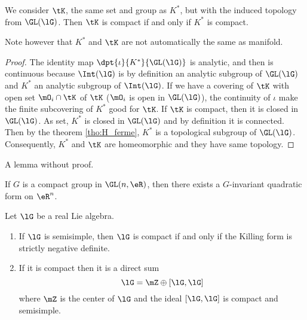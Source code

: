 \begin{proposition}
We consider $\tK$, the same set and group as $K^*$, but with the induced topology from $\GL(\lG)$. Then $\tK$ is compact if and only if $K^*$ is compact.
\end{proposition}

Note however that $K^*$ and $\tK$ are not automatically the same as manifold.

\begin{proof}
The identity map $\dpt{\iota}{K^*}{\GL(\lG)}$ is analytic, and then is continuous because $\Int(\lG)$ is by definition an analytic subgroup of $\GL(\lG)$ and $K^*$ an analytic subgroup of $\Int(\lG)$. If we have a covering of $\tK$ with open set $\mO_i\cap\tK$ of $\tK$ ($\mO_i$ is open in $\GL(\lG)$), the continuity of $\iota$ make the finite subcovering of $K^*$ good for $\tK$.
If $\tK$ is compact, then it is closed in $\GL(\lG)$. As set, $K^*$ is closed in $\GL(\lG)$ and by definition it is connected. Then by the theorem \ref{tho:H_ferme}, $K^*$ is a topological subgroup of $\GL(\lG)$. Consequently, $K^*$ and $\tK$ are homeomorphic and they have same topology.
\end{proof}

A lemma without proof.
\begin{lemma}
If $G$ is a compact group in $\GL(n,\eR)$, then there exists a $G$-invariant quadratic form on $\eR^n$.
\end{lemma}

\begin{proposition}     \label{ProplGcompactKillNeg}
Let $\lG$ be a real Lie algebra.

\begin{enumerate}
\item If $\lG$ is semisimple, then $\lG$ is compact if and only if  the Killing form is strictly negative definite.
\item If it is compact then it is a direct sum
\begin{equation}
   \lG=\mZ\oplus [\lG,\lG]
\end{equation}
where $\mZ$ is the center of $\lG$ and the ideal $[\lG,\lG]$ is compact and semisimple.
\end{enumerate}
\label{prop:compact_Killing}
\end{proposition}

